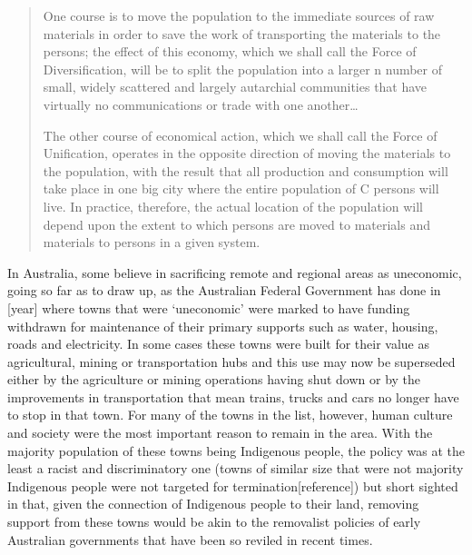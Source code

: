 \begin{quotation}
One course is to move the population to the immediate sources of raw materials in order to save the work of transporting the materials to the persons; the effect of this economy, which we shall call the Force of Diversification, will be to split the population into a larger n number of small, widely scattered and largely autarchial communities that have virtually no communications or trade with one another\ldots

The other course of economical action, which we shall call the Force of Unification, operates in the opposite direction of moving the materials to the population, with the result that all production and consumption will take place in one big city where the entire population of C persons will live. In practice, therefore, the actual location of the population will depend upon the extent to which persons are moved to materials and materials to persons in a given system\cite{RefWorks:299}.
\end{quotation}


In Australia, some believe in sacrificing remote and regional areas as uneconomic, going so far as to draw up, as the Australian Federal Government has done in [year] where towns that were `uneconomic' were marked to have funding withdrawn for maintenance of their primary supports such as water, housing, roads and electricity. In some cases these towns were built for their value as agricultural, mining or transportation hubs and this use may now be superseded either by the agriculture or mining operations having shut down or by the improvements in transportation that mean trains, trucks and cars no longer have to stop in that town. For many of the towns in the list, however, human culture and society were the most important reason to remain in the area. With the majority population of these towns being Indigenous people, the policy was at the least a racist and discriminatory one (towns of similar size that were not majority Indigenous people were not targeted for termination[reference]) but short sighted in that, given the connection of Indigenous people to their land, removing support from these towns would be akin to the removalist policies of early Australian governments that have been so reviled in recent times.

